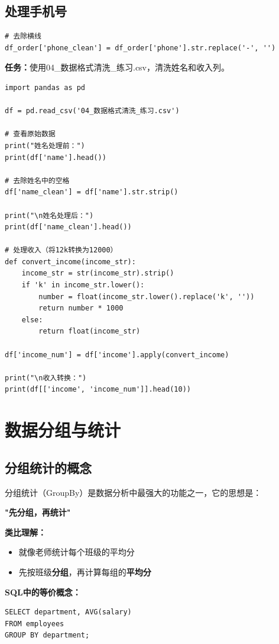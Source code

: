 \documentclass[12pt,a4paper]{article}
\begin{document}
\subsection{处理手机号}

\begin{lstlisting}[caption={标准化手机号}]
# 去除横线
df_order['phone_clean'] = df_order['phone'].str.replace('-', '')
\end{lstlisting}

\begin{practicebox}
\textbf{任务：}使用04\_数据格式清洗\_练习.csv，清洗姓名和收入列。

\begin{lstlisting}
import pandas as pd

df = pd.read_csv('04_数据格式清洗_练习.csv')

# 查看原始数据
print("姓名处理前：")
print(df['name'].head())

# 去除姓名中的空格
df['name_clean'] = df['name'].str.strip()

print("\n姓名处理后：")
print(df['name_clean'].head())

# 处理收入（将12k转换为12000）
def convert_income(income_str):
    income_str = str(income_str).strip()
    if 'k' in income_str.lower():
        number = float(income_str.lower().replace('k', ''))
        return number * 1000
    else:
        return float(income_str)

df['income_num'] = df['income'].apply(convert_income)

print("\n收入转换：")
print(df[['income', 'income_num']].head(10))
\end{lstlisting}
\end{practicebox}

\section{数据分组与统计}

\subsection{分组统计的概念}

\begin{theorybox}[什么是分组统计？]
分组统计（GroupBy）是数据分析中最强大的功能之一，它的思想是：

\textbf{"先分组，再统计"}

\textbf{类比理解：}
\begin{itemize}
    \item 就像老师统计每个班级的平均分
    \item 先按班级\textbf{分组}，再计算每组的\textbf{平均分}
\end{itemize}

\textbf{SQL中的等价概念：}
\begin{verbatim}
SELECT department, AVG(salary) 
FROM employees 
GROUP BY department;
\end{verbatim}
\end{theorybox}
\end{document}
